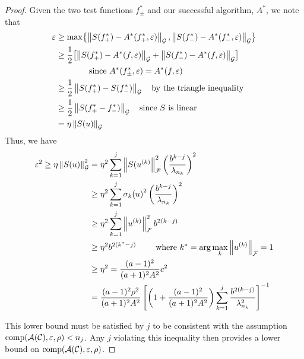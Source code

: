 \documentclass[final]{elsarticle}
\theoremstyle{definition}
\theoremstyle{remark}
\begin{document}
\begin{proof}
Given the two test functions $f^*_\pm$ and our successful algorithm, $A^*$, we note that
\begin{align*}
\varepsilon &\ge \max \bigl\{\norm[\cg]{S(f^*_+) - A^*(f^*_+,\varepsilon)}, \norm[\cg]{S(f^*_-) - A^*(f^*_-,\varepsilon)} \bigr\} \\
&\ge \frac 12 \bigl[\norm[\cg]{S(f^*_+) - A^*(f,\varepsilon)} + \norm[\cg]{S(f^*_-) - A^*(f,\varepsilon)}  \bigr] \\
&\qquad \qquad \text{since } A^*(f^*_\pm,\varepsilon) = A^*(f,\varepsilon) \\
&\ge \frac 12 \norm[\cg]{S(f^*_+) - S(f^*_-)} \quad \text{by the triangle inequality}\\
&\ge \frac 12 \norm[\cg]{S(f^*_+ - f^*_-)} \quad \text{since $S$ is linear}\\
&= \eta \norm[\cg]{S(u)}
\end{align*}
Thus, we have
\begin{align*}
\varepsilon^2 \ge \eta \norm[\cg]{S(u)}^2 & = 
\eta^2\sum_{k=1}^{j} \norm[\cf]{S(u^{(k)}}^2 
\left(\frac{b^{k-j}}{\lambda_{n_k}}\right)^2\\
& \ge \eta^2 
\sum_{k=1}^{j} {\sigma_k(u)}^2 
\left(\frac{b^{k-j}}{\lambda_{n_k}}\right)^2\\
& \ge \eta^2 
\sum_{k=1}^{j} \norm[\cf]{u^{(k)}}^2 
b^{2(k-j)}\\
& \ge  \eta^2 b^{2(k^{*}-j)} \qquad \text{ where } k^* = \arg\max_{k} \norm[\cf]{u^{(k)}} = 1\\
& \ge \eta^2 = \frac{(a-1)^2}{(a+1)^2A^2}c^2 \\
&
=\frac{(a-1)^2 \rho^2}{(a+1)^2A^2}\left[\left(1+\frac{(a-1)^2}{(a+1)^{2} A^2 }\right)\sum_{k=1}^j \frac{b^{2(k-j)}}{\lambda_{n_{k}}^2}\right]^{-1}
\end{align*}

This lower bound must be satisfied by $j$ to be consistent with the assumption $\comp(\ca(\cc),\varepsilon,\rho) < n_j$.  Any $j$ violating this inequality then provides a lower bound on $\comp(\ca(\cc),\varepsilon,\rho)$.
\end{proof}
\end{document}
